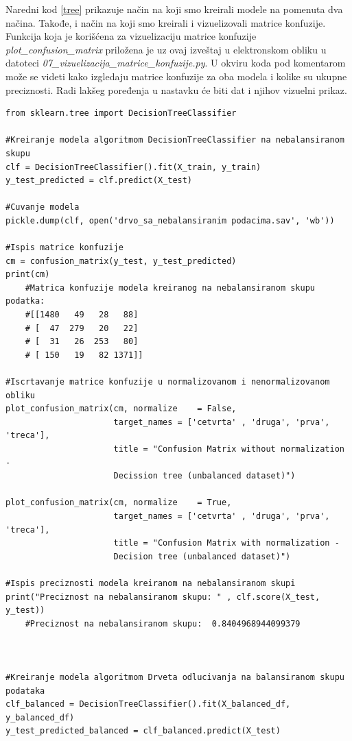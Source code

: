 \documentclass[a4paper]{article}
\begin{document}
Naredni kod \ref{tree} prikazuje način na koji smo kreirali modele na pomenuta dva načina. Takođe, i način na koji smo kreirali i vizuelizovali matrice konfuzije. Funkcija koja je korišćena za vizuelizaciju matrice konfuzije {\em plot\_confusion\_matrix} priložena je uz ovaj izveštaj u elektronskom obliku u datoteci {\em 07\_vizuelizacija\_matrice\_konfuzije.py}. U okviru koda pod komentarom može se videti kako izgledaju matrice konfuzije za oba modela i kolike su ukupne preciznosti. Radi lakšeg poređenja u nastavku će biti dat i njihov vizuelni prikaz.
\\
\begin{lstlisting}[caption={Kreiranje modela metodom drveta odlučivanja},frame=single, label=tree]
from sklearn.tree import DecisionTreeClassifier

#Kreiranje modela algoritmom DecisionTreeClassifier na nebalansiranom skupu
clf = DecisionTreeClassifier().fit(X_train, y_train)
y_test_predicted = clf.predict(X_test)

#Cuvanje modela
pickle.dump(clf, open('drvo_sa_nebalansiranim podacima.sav', 'wb'))

#Ispis matrice konfuzije
cm = confusion_matrix(y_test, y_test_predicted)
print(cm)
	#Matrica konfuzije modela kreiranog na nebalansiranom skupu podatka:
	#[[1480   49   28   88]
	# [  47  279   20   22]
	# [  31   26  253   80]
	# [ 150   19   82 1371]]

#Iscrtavanje matrice konfuzije u normalizovanom i nenormalizovanom obliku
plot_confusion_matrix(cm, normalize    = False,
                      target_names = ['cetvrta' , 'druga', 'prva', 'treca'],
                      title = "Confusion Matrix without normalization - 
                      Decission tree (unbalanced dataset)")

plot_confusion_matrix(cm, normalize    = True,
                      target_names = ['cetvrta' , 'druga', 'prva', 'treca'],
                      title = "Confusion Matrix with normalization - 
                      Decision tree (unbalanced dataset)")

#Ispis preciznosti modela kreiranom na nebalansiranom skupi
print("Preciznost na nebalansiranom skupu: " , clf.score(X_test, y_test))
	#Preciznost na nebalansiranom skupu:  0.8404968944099379



#Kreiranje modela algoritmom Drveta odlucivanja na balansiranom skupu podataka
clf_balanced = DecisionTreeClassifier().fit(X_balanced_df, y_balanced_df)
y_test_predicted_balanced = clf_balanced.predict(X_test)


\end{lstlisting}
\end{document}
